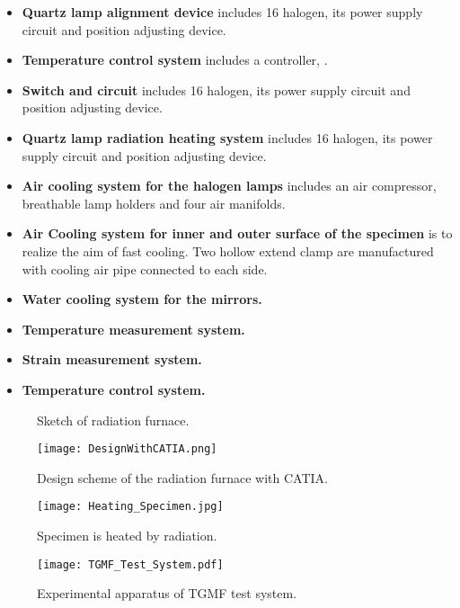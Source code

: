 \begin{itemize}
\item \textbf{Quartz lamp alignment device} includes 16 halogen, its power supply circuit and position adjusting device.
\item \textbf{Temperature control system} includes a controller, .
\item \textbf{Switch and circuit} includes 16 halogen, its power supply circuit and position adjusting device.

\item \textbf{Quartz lamp radiation heating system} includes 16 halogen, its power supply circuit and position adjusting device.
\item \textbf{Air cooling system for the halogen lamps} includes an air compressor, breathable lamp holders and four air manifolds.
\item \textbf{Air Cooling system for inner and outer surface of the specimen } is to realize the aim of fast cooling. Two hollow extend clamp are manufactured with cooling air pipe connected to each side.

\item \textbf{Water cooling system for the mirrors.}
\item \textbf{Temperature measurement system.}
\item \textbf{Strain measurement system.}
\item \textbf{Temperature control system.}
\end{itemize}


\begin{figure}[!htp]
\centering{}
\caption{Sketch of radiation furnace.}
\label{Fig:Radiation_Furnace}
\end{figure}

\begin{figure}[!htp]
	\centering
	\texttt{[image: DesignWithCATIA.png]}
	\caption{Design scheme of the radiation furnace with CATIA.}
	\label{Fig:DesignWithCAITA}
\end{figure}

\begin{figure}[!htp]
	\centering
	\texttt{[image: Heating\_Specimen.jpg]}
	\caption{Specimen is heated by radiation.}
	\label{Fig:Heating_Specimen}
\end{figure}

\begin{figure}[!htp]
	\centering
	\texttt{[image: TGMF\_Test\_System.pdf]}
	\caption{Experimental apparatus of TGMF test system.}
	\label{Fig:TGMF_Test_System}
\end{figure}

